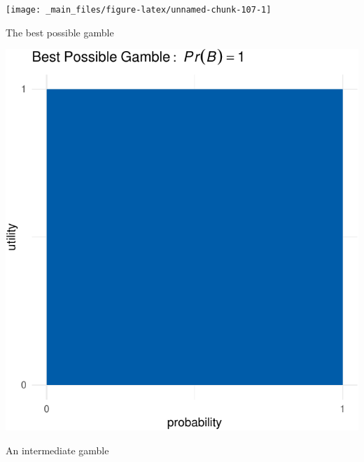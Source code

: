 \documentclass[justified]{tufte-book}
\theoremstyle{definition}
\theoremstyle{definition}
\theoremstyle{definition}
\theoremstyle{definition}
\theoremstyle{remark}
\begin{document}
\begin{marginfigure}
\texttt{[image: \_main\_files/figure-latex/unnamed-chunk-107-1]} \caption[The best possible gamble]{The best possible gamble}\label{fig:unnamed-chunk-107}
\end{marginfigure}
\begin{marginfigure}
\includegraphics{_main_files/figure-latex/unnamed-chunk-108-1} \caption[An intermediate gamble]{An intermediate gamble}\label{fig:unnamed-chunk-108}
\end{marginfigure}
\end{document}
